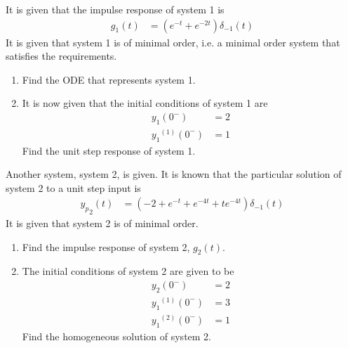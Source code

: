 \documentclass[fleqn, a4paper, 11pt, oneside]{amsart}
\theoremstyle{definition}
\theoremstyle{theorem}
\begin{document}
\begin{question}
	It is given that the impulse response of system 1 is
	\begin{align*}
		g_1(t) & = \left( e^{-t} + e^{-2 t} \right) \delta_{-1}(t)
	\end{align*}
	It is given that system 1 is of minimal order, i.e. a minimal order system that satisfies the requirements.
	\begin{enumerate}
		\item
			Find the ODE that represents system 1.
		\item
			It is now given that the initial conditions of system 1 are
			\begin{align*}
				y_1(0^-)         & = 2 \\
				{y_1}^{(1)}(0^-) & = 1
			\end{align*}
			Find the unit step response of system 1.
	\end{enumerate}
	Another system, system 2, is given.
	It is known that the particular solution of system 2 to a unit step input is
	\begin{align*}
		{y_p}_2(t) & = \left( -2 + e^{-t} + e^{-4 t} + t e^{-4 t} \right) \delta_{-1}(t)
	\end{align*}
	It is given that system 2 is of minimal order.
	\begin{enumerate}[resume]
		\item
			Find the impulse response of system 2, $g_2(t)$.
		\item
			The initial conditions of system 2 are given to be
			\begin{align*}
				y_2(0^-)         & = 2 \\
				{y_1}^{(1)}(0^-) & = 3 \\
				{y_1}^{(2)}(0^-) & = 1
			\end{align*}
			Find the homogeneous solution of system 2.
	\end{enumerate}
\end{question}
\end{document}
